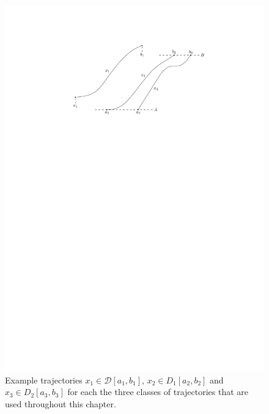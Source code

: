 \documentclass[a4paper]{article}
\theoremstyle{definition}
\theoremstyle{plain}
\begin{document}
\begin{figure}
  \centering
  \includegraphics[scale=0.9]{figures/motion/trajectories}
  \caption{Example trajectories $x_{1} \in \mathcal{D}[a_{1},b_{1}]$,
    $x_{2} \in D_{1}[a_{2},b_{2}]$ and $x_{3} \in D_{2}[a_{3},b_{3}]$ for each the
    three classes of trajectories that are used throughout this chapter.}%
  \label{fig:trajectories}
\end{figure}
\end{document}
